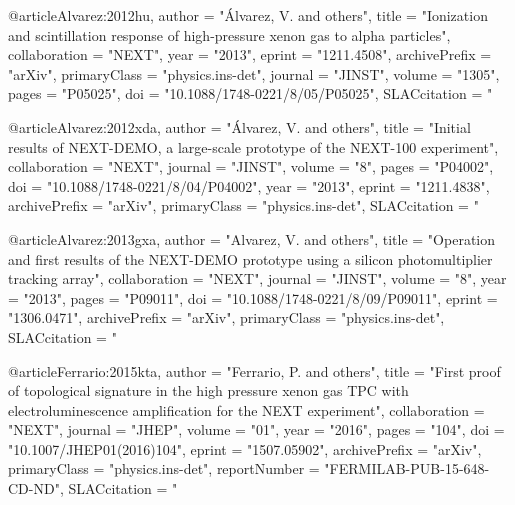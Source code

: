 {{@article{Alvarez:2012hu,
      author         = "\'Alvarez, V. and others",
      title          = "{Ionization and scintillation response of high-pressure
                        xenon gas to alpha particles}",
      collaboration  = "NEXT",
      year           = "2013",
      eprint         = "1211.4508",
      archivePrefix  = "arXiv",
      primaryClass   = "physics.ins-det",
      journal        = "JINST",
      volume         = "1305",
      pages          = "P05025",
      doi            = "10.1088/1748-0221/8/05/P05025",
      SLACcitation   = "%
}

@article{Alvarez:2012xda,
      author         = "\'Alvarez, V. and others",
      title          = "{Initial results of NEXT-DEMO, a large-scale prototype of the NEXT-100 experiment}",
      collaboration  = "NEXT",
      journal        = "JINST",
      volume         = "8",
      pages          = "P04002",
      doi            = "10.1088/1748-0221/8/04/P04002",
      year           = "2013",
      eprint         = "1211.4838",
      archivePrefix  = "arXiv",
      primaryClass   = "physics.ins-det",
      SLACcitation   = "%
}

@article{Alvarez:2013gxa,
      author         = "Alvarez, V. and others",
      title          = "{Operation and first results of the NEXT-DEMO prototype
                        using a silicon photomultiplier tracking array}",
      collaboration  = "NEXT",
      journal        = "JINST",
      volume         = "8",
      year           = "2013",
      pages          = "P09011",
      doi            = "10.1088/1748-0221/8/09/P09011",
      eprint         = "1306.0471",
      archivePrefix  = "arXiv",
      primaryClass   = "physics.ins-det",
      SLACcitation   = "%
}

@article{Ferrario:2015kta,
      author         = "Ferrario, P. and others",
      title          = "{First proof of topological signature in the high
                        pressure xenon gas TPC with electroluminescence
                        amplification for the NEXT experiment}",
      collaboration  = "NEXT",
      journal        = "JHEP",
      volume         = "01",
      year           = "2016",
      pages          = "104",
      doi            = "10.1007/JHEP01(2016)104",
      eprint         = "1507.05902",
      archivePrefix  = "arXiv",
      primaryClass   = "physics.ins-det",
      reportNumber   = "FERMILAB-PUB-15-648-CD-ND",
      SLACcitation   = "%
}

}}
